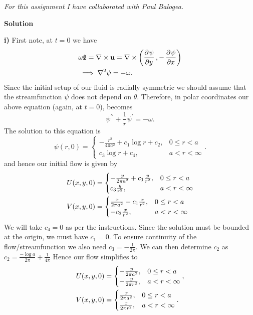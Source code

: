 \documentclass{article}
\def\*#1{\mathbf{#1}}
\newcommand{\zhat}{\mathbf{\hat{z}}}
\begin{document}
\newpage

\textit{For this assignment I have collaborated with Paul Balogea.}

\textbf{Solution}

\textbf{i)} First note, at $t = 0$ we have
%
\begin{align*}
    &\omega \zhat = \nabla \times \*u = \nabla \times \del{\dpd{\psi}{y}, - \dpd{\psi}{x}} \\
    &\implies \nabla^2 \psi = - \omega
    .
\end{align*}
%
Since the initial setup of our fluid is radially symmetric we should
assume that the streamfunction $\psi$ does not depend on $\theta$.
Therefore, in polar coordinates our above equation (again, at $t = 0$),
becomes
%
\begin{equation*}
    \psi^{\prime \prime} + \frac{1}{r} \psi^\prime = - \omega
    .
\end{equation*}
%
The solution to this equation is
%
\begin{equation*}
    \psi(r, 0) =
    \begin{cases}
        - \frac{r^2}{4 \pi a^2} + c_1 \log r + c_2, &0 \leq r < a \\
        c_3 \log r + c_4, &a < r < \infty
    \end{cases}
    .
\end{equation*}
%
and hence our initial flow is given by
%
\begin{align*}
    U(x, y, 0) &=
    \begin{cases}
        - \frac{y}{2 \pi a^2} + c_1 \frac{y}{r^2}, &0 \leq r < a \\
        c_3 \frac{y}{r^2}, &a < r < \infty
    \end{cases}
    \\
    \vspace{10mm}
    V(x, y, 0) &=
    \begin{cases}
        \frac{x}{2 \pi a^2} - c_1 \frac{x}{r^2}, &0 \leq r < a \\
        - c_3 \frac{x}{r^2}, &a < r < \infty
    \end{cases}
\end{align*}
%
We will take $c_4 = 0$ as per the instructions. Since the solution must
be bounded at the origin, we must have $c_1 = 0$. To ensure continuity
of the flow/streamfunction we also need $c_3 = - \frac{1}{2 \pi}$. We can
then determine $c_2$ as $c_2 = \frac{-\log a}{2 \pi} + \frac{1}{4 \pi}$
Hence our flow simplifies to
%
\begin{align*}
    U(x, y, 0) &=
    \begin{cases}
        - \frac{y}{2 \pi a^2}, &0 \leq r < a \\
        - \frac{y}{2 \pi r^2}, &a < r < \infty
    \end{cases}
    ,
    \\
    \vspace{10mm}
    V(x, y, 0) &=
    \begin{cases}
        \frac{x}{2 \pi a^2}, &0 \leq r < a \\
        \frac{x}{2 \pi r^2}, &a < r < \infty
    \end{cases}
    .
\end{align*}
\end{document}
